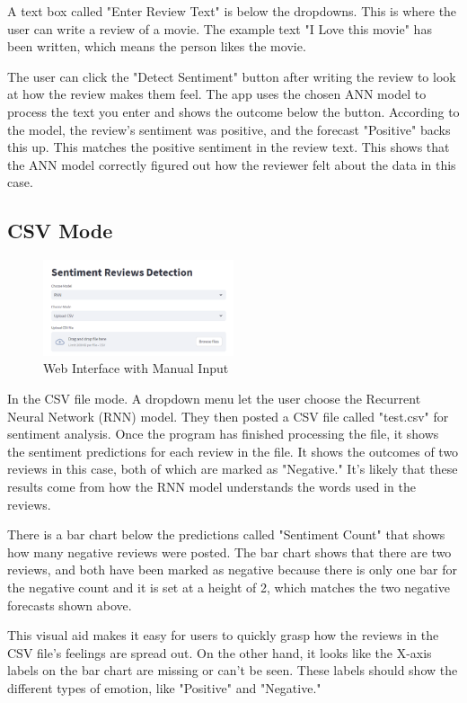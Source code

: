 \documentclass[11pt,a4paper]{article}
\begin{document}
A text box called "Enter Review Text" is below the dropdowns. This is where the user can write a review of a movie. The example text "I Love this movie" has been written, which means the person likes the movie.

The user can click the "Detect Sentiment" button after writing the review to look at how the review makes them feel. The app uses the chosen ANN model to process the text you enter and shows the outcome below the button. According to the model, the review's sentiment was positive, and the forecast "Positive" backs this up. This matches the positive sentiment in the review text.
This shows that the ANN model correctly figured out how the reviewer felt about the data in this case.

\subsection{CSV Mode}

\begin{figure}[ht]
    \centering
    \includegraphics[width=0.5\textwidth]{web2.png}
    \caption{Web Interface with Manual Input}
    \label{fig:polarity_distribution}
\end{figure}

In the CSV file mode. A dropdown menu let the user choose the Recurrent Neural Network (RNN) model. They then posted a CSV file called "test.csv" for sentiment analysis. Once the program has finished processing the file, it shows the sentiment predictions for each review in the file. It shows the outcomes of two reviews in this case, both of which are marked as "Negative." It's likely that these results come from how the RNN model understands the words used in the reviews.

There is a bar chart below the predictions called "Sentiment Count" that shows how many negative reviews were posted. The bar chart shows that there are two reviews, and both have been marked as negative because there is only one bar for the negative count and it is set at a height of 2, which matches the two negative forecasts shown above.

This visual aid makes it easy for users to quickly grasp how the reviews in the CSV file's feelings are spread out. On the other hand, it looks like the X-axis labels on the bar chart are missing or can't be seen. These labels should show the different types of emotion, like "Positive" and "Negative."
\end{document}
